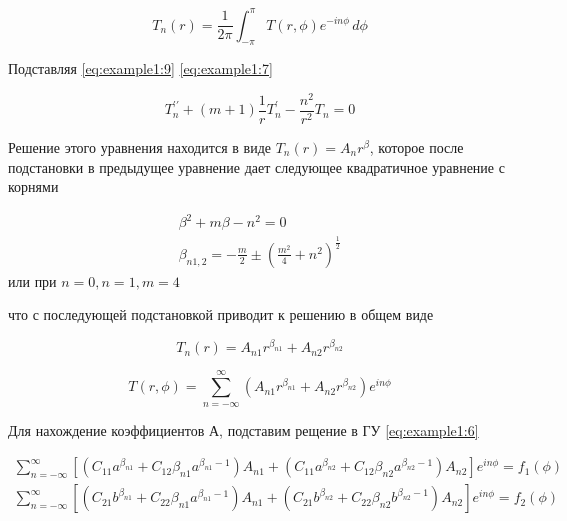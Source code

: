\begin{equation}
	\label{eq:example1:9}
	T_n(r) = \frac{1}{2\pi} \int_{-\pi}^{\pi} T(r, \phi) e^{-in\phi} \,d\phi
\end{equation}

Подставляя \cref{eq:example1:9} \cref{eq:example1:7}

\begin{equation}
	\label{eq:example1:10}
	T_{n}^{\prime \prime} + (m+1)\frac{1}{r}T_{n}^{\prime}-\frac{n^2}{r^2}T_{n} =0
\end{equation}

Решение этого уравнения находится в виде \(T_n(r) = A_n r^{\beta}\), которое после подстановки в предыдущее уравнение дает следующее квадратичное уравнение с корнями

\begin{equation*}
	\begin{split}
		\beta^2 +m \beta - n^2 =0\\
		\beta_{n1,2} = -\frac{m}{2} \pm \left(\frac{m^2}{4} + n^2 \right)^{\frac{1}{2}}
	\end{split}
\end{equation*}
или
при \(n=0, n=1, m=4\)


что с последующей подстановкой приводит к решению в общем виде

\begin{equation*}
	T_n(r) = A_{n1} r^{\beta_{n1}} + A_{n2} r^{\beta_{n2}}
\end{equation*}

\begin{equation}
	\label{eq:example1:11}
	T(r, \phi) = \sum_{n=-\infty}^{\infty} \left ( A_{n1} r^{\beta_{n1}} + A_{n2} r^{\beta_{n2}} \right ) e^{in\phi}
\end{equation}



Для нахождение коэффициентов А, подставим рещение в ГУ \cref{eq:example1:6}

\begin{equation*}
\begin{split}
\sum_{n=-\infty}^{\infty} \left [ \left (C_{11} a^{\beta_{n1}} +C_{12} \beta_{n1} a^{\beta_{n1} -1} \right ) A_{n1}  +\left (C_{11} a^{\beta_{n2}} +C_{12} \beta_{n2} a^{\beta_{n2} -1} \right ) A_{n2} \right ] e^{in\phi} = f_1(\phi) \\
\sum_{n=-\infty}^{\infty} \left [ \left (C_{21} b^{\beta_{n1}} +C_{22} \beta_{n1} a^{\beta_{n1} -1} \right ) A_{n1}  +\left (C_{21} b^{\beta_{n2}} +C_{22} \beta_{n2} b^{\beta_{n2} -1} \right ) A_{n2} \right ] e^{in\phi} = f_2(\phi)
\end{split}
\end{equation*}


